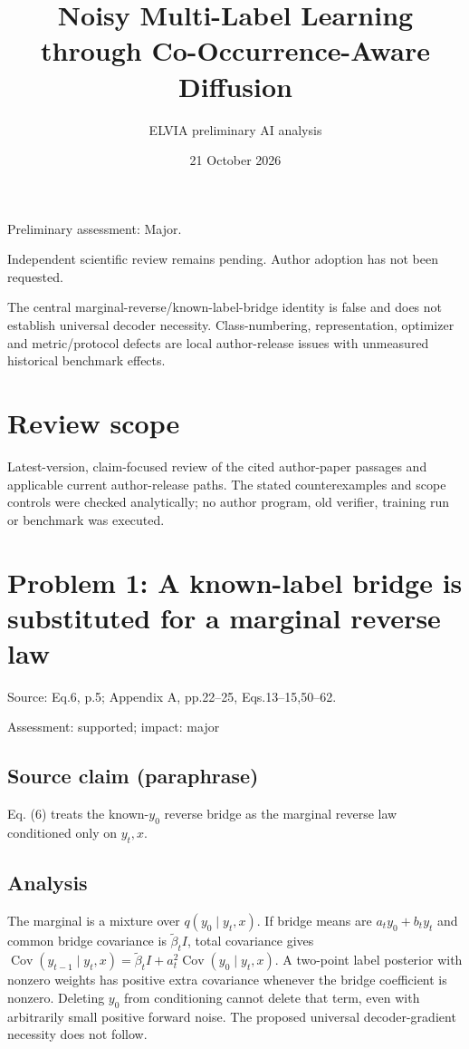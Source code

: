 \documentclass[11pt]{article}
\begin{document}
\title{Noisy Multi-Label Learning through Co-Occurrence-Aware Diffusion}

\author{ELVIA preliminary AI analysis}\date{21 October 2026}\maketitle

Preliminary assessment: Major.\par

Independent scientific review remains pending. Author adoption has not been requested.

The central marginal-reverse/known-label-bridge identity is false and does not establish universal decoder necessity. Class-numbering, representation, optimizer and metric/protocol defects are local author-release issues with unmeasured historical benchmark effects.

\section*{Review scope}

Latest-version, claim-focused review of the cited author-paper passages and applicable current author-release paths. The stated counterexamples and scope controls were checked analytically; no author program, old verifier, training run or benchmark was executed.

\section*{Problem 1: A known-label bridge is substituted for a marginal reverse law}

Source: Eq.6, p.5; Appendix A, pp.22–25, Eqs.13–15,50–62.

Assessment: supported; impact: major

\subsection*{Source claim (paraphrase)}

Eq. (\(6\)) treats the known-\(y_0\) reverse bridge as the marginal reverse law conditioned only on \(y_t,x\).

\subsection*{Analysis}

The marginal is a mixture over \(q(y_0\mid y_t,x)\). If bridge means are \(a_ty_0+b_ty_t\) and common bridge covariance is \(\widetilde\beta_tI\), total covariance gives \(\operatorname{Cov}(y_{t-1}\mid y_t,x)=\widetilde\beta_tI+a_t^2\operatorname{Cov}(y_0\mid y_t,x)\). A two-point label posterior with nonzero weights has positive extra covariance whenever the bridge coefficient is nonzero. Deleting \(y_0\) from conditioning cannot delete that term, even with arbitrarily small positive forward noise. The proposed universal decoder-gradient necessity does not follow.
\end{document}
